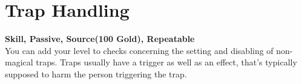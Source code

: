 \section{Trap Handling}\label{sec:trapHandling}
\textbf{Skill, Passive, Source(100 Gold), Repeatable}\\
You can add your level to checks concerning the setting and disabling of non-magical traps. Traps usually have a trigger as well as an effect, that's typically supposed to harm the person triggering the trap.\\
